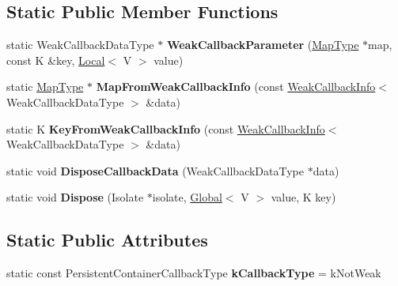 \subsection*{Static Public Member Functions}
\begin{DoxyCompactItemize}
\item 
\mbox{\label{classv8_1_1DefaultPersistentValueMapTraits_a63b6fc80207ce6ac7d1eaa306b68768c}} 
static Weak\+Callback\+Data\+Type $\ast$ {\bfseries Weak\+Callback\+Parameter} (\mbox{\hyperlink{classv8_1_1PersistentValueMap}{Map\+Type}} $\ast$map, const K \&key, \mbox{\hyperlink{classv8_1_1Local}{Local}}$<$ V $>$ value)
\item 
\mbox{\label{classv8_1_1DefaultPersistentValueMapTraits_ad5a476677abdec41871199920820e8bd}} 
static \mbox{\hyperlink{classv8_1_1PersistentValueMap}{Map\+Type}} $\ast$ {\bfseries Map\+From\+Weak\+Callback\+Info} (const \mbox{\hyperlink{classv8_1_1WeakCallbackInfo}{Weak\+Callback\+Info}}$<$ Weak\+Callback\+Data\+Type $>$ \&data)
\item 
\mbox{\label{classv8_1_1DefaultPersistentValueMapTraits_a9d757cce8008b477a513c6d30a2b6328}} 
static K {\bfseries Key\+From\+Weak\+Callback\+Info} (const \mbox{\hyperlink{classv8_1_1WeakCallbackInfo}{Weak\+Callback\+Info}}$<$ Weak\+Callback\+Data\+Type $>$ \&data)
\item 
\mbox{\label{classv8_1_1DefaultPersistentValueMapTraits_a9e5c3a4a054b13f46065adec2c44ddfe}} 
static void {\bfseries Dispose\+Callback\+Data} (Weak\+Callback\+Data\+Type $\ast$data)
\item 
\mbox{\label{classv8_1_1DefaultPersistentValueMapTraits_a28f1a2d349eb5a6ad376b6e968d51490}} 
static void {\bfseries Dispose} (Isolate $\ast$isolate, \mbox{\hyperlink{classv8_1_1Global}{Global}}$<$ V $>$ value, K key)
\end{DoxyCompactItemize}
\subsection*{Static Public Attributes}
\begin{DoxyCompactItemize}
\item 
\mbox{\label{classv8_1_1DefaultPersistentValueMapTraits_a1f57d8246e4ace68bc9be1047eb7cc40}} 
static const Persistent\+Container\+Callback\+Type {\bfseries k\+Callback\+Type} = k\+Not\+Weak
\end{DoxyCompactItemize}


